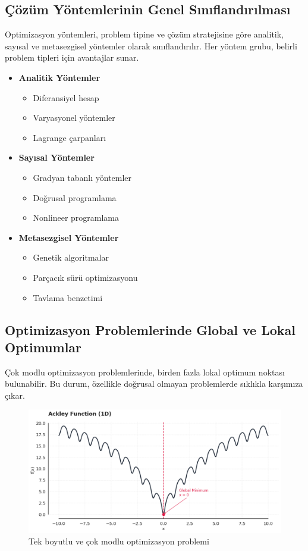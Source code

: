 \subsection{Çözüm Yöntemlerinin Genel Sınıflandırılması}
Optimizasyon yöntemleri, problem tipine ve çözüm stratejisine göre analitik, sayısal ve metasezgisel yöntemler olarak sınıflandırılır. Her yöntem grubu, belirli problem tipleri için avantajlar sunar.

\begin{itemize}
    \item \textbf{Analitik Yöntemler}
        \begin{itemize}
            \item Diferansiyel hesap
            \item Varyasyonel yöntemler
            \item Lagrange çarpanları
        \end{itemize}
    \item \textbf{Sayısal Yöntemler}
        \begin{itemize}
            \item Gradyan tabanlı yöntemler
            \item Doğrusal programlama
            \item Nonlineer programlama
        \end{itemize}
    \item \textbf{Metasezgisel Yöntemler}
        \begin{itemize}
            \item Genetik algoritmalar
            \item Parçacık sürü optimizasyonu
            \item Tavlama benzetimi
        \end{itemize}
\end{itemize}

\subsection{Optimizasyon Problemlerinde Global ve Lokal Optimumlar}

Çok modlu optimizasyon problemlerinde, birden fazla lokal optimum noktası bulunabilir. Bu durum, özellikle doğrusal olmayan problemlerde sıklıkla karşımıza çıkar.

\begin{figure}[H]
    \centering
    \includegraphics[width=\textwidth]{weeks_new/imgs/multi_mod.png}
    \caption{Tek boyutlu ve çok modlu optimizasyon problemi}
    \label{fig:multi_mod}
\end{figure}

